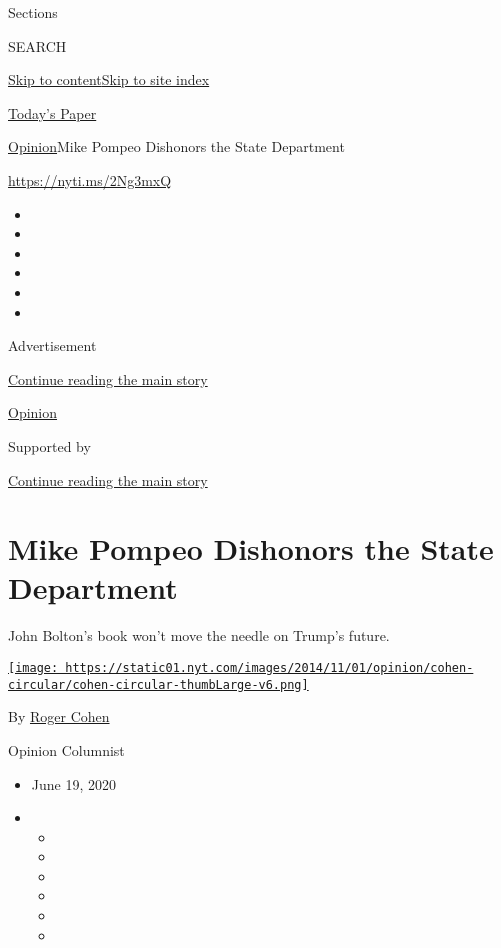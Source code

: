 Sections

SEARCH

\protect\hyperlink{site-content}{Skip to
content}\protect\hyperlink{site-index}{Skip to site index}

\href{https://myaccount.nytimes.com/auth/login?response_type=cookie\&client_id=vi}{}

\href{https://www.nytimes.com/section/todayspaper}{Today's Paper}

\href{/section/opinion}{Opinion}\textbar{}Mike Pompeo Dishonors the
State Department

\href{https://nyti.ms/2Ng3mxQ}{https://nyti.ms/2Ng3mxQ}

\begin{itemize}
\item
\item
\item
\item
\item
\item
\end{itemize}

Advertisement

\protect\hyperlink{after-top}{Continue reading the main story}

\href{/section/opinion}{Opinion}

Supported by

\protect\hyperlink{after-sponsor}{Continue reading the main story}

\hypertarget{mike-pompeo-dishonors-the-state-department}{%
\section{Mike Pompeo Dishonors the State
Department}\label{mike-pompeo-dishonors-the-state-department}}

John Bolton's book won't move the needle on Trump's future.

\href{https://www.nytimes.com/by/roger-cohen}{\texttt{[image: https://static01.nyt.com/images/2014/11/01/opinion/cohen-circular/cohen-circular-thumbLarge-v6.png]}}

By \href{https://www.nytimes.com/by/roger-cohen}{Roger Cohen}

Opinion Columnist

\begin{itemize}
\item
  June 19, 2020
\item
  \begin{itemize}
  \item
  \item
  \item
  \item
  \item
  \item
  \end{itemize}
\end{itemize}

